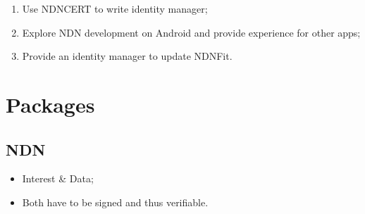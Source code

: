 \documentclass[a0,portrait]{poster}
\begin{document}
\begin{multicols}{2}
\begin{enumerate}
\item Use NDNCERT to write identity manager;
\item Explore NDN development on Android and provide experience for other apps;
\item Provide an identity manager to update NDNFit.
\end{enumerate}


\section*{Packages}

\begin{minipage}[b]{0.3\linewidth}
\subsection*{NDN\cite{zhang2014named}}
\par
	\begin{itemize}
		\item Interest \& Data;
		\item Both have to be signed and thus verifiable.
	\end{itemize}


\end{minipage}
\end{multicols}
\end{document}
